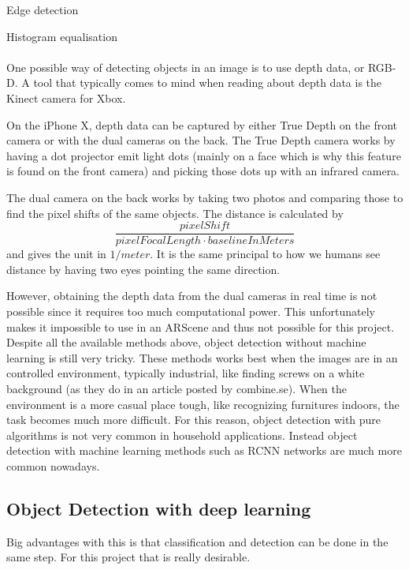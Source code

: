 Edge detection

Histogram equalisation
\\\\
One possible way of detecting objects in an image is to use depth data, or RGB-D.
A tool that typically comes to mind when reading about depth data is the Kinect camera
for Xbox.

On the iPhone X, depth data can be captured by either True Depth on the front camera or with the dual cameras on the back. The True Depth camera works by having a dot projector emit light dots (mainly on a face which is why this feature is found on the front camera) and picking those dots up with an infrared camera.

The dual camera on the back works by taking two photos and comparing those to find the pixel shifts of the same objects. The distance is calculated by \[ \frac{pixelShift} { pixelFocalLength \cdot baselineInMeters}\] and gives the unit in $1/meter$. It is the same principal to how we humans see distance by having two eyes pointing the same direction. \cite{depthMap}

However, obtaining the depth data from the dual cameras in real time is not possible since it requires too much computational power. This unfortunately makes it impossible to use in an ARScene and thus not possible for this project.\\

Despite all the available methods above, object detection without machine learning is still very tricky. These methods works best when the images are in an controlled environment, typically industrial, like finding screws on a white background (as they do in an article posted by combine.se). \cite{combine}
When the environment is a more casual place tough, like recognizing furnitures indoors, the task becomes much more difficult. For this reason, object detection with pure algorithms is not very common in household applications. Instead object detection with machine learning methods such as RCNN networks are much more common nowadays.

\subsection{Object Detection with deep learning}

Big advantages with this is that classification and detection can be done in the same
 step. For this project that is really desirable.
 
